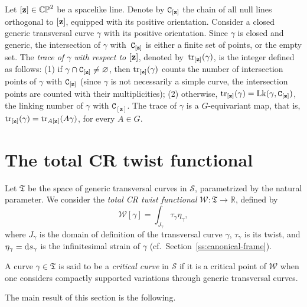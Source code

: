 \documentclass[pdftex]{sigma}
\numberwithin{equation}{section}
\begin{document}
 \begin{Definition}
Let $[{\bf z}]\in \mathbb{CP}^2$ be a spacelike line.
Denote by ${\mathtt C}_{[{\bf z}]}$ the chain of all null lines orthogonal to $[{\bf z}]$, equipped with its positive orientation.
Consider a closed generic transversal curve $\gamma$ with its positive orientation.
Since $\gamma$ is closed and generic, the intersection of $\gamma$ with~${\mathtt C}_{[{\bf z}]}$ is either a finite
set of points, or
the empty set.
The \emph{trace of $\gamma$ with respect to $[{\bf z}]$}, denoted by~${\rm tr}_{[{\mathbf z}]}(\gamma)$,
 is the integer defined as follows: (1) if $\gamma \cap {\mathtt C}_{[{\bf z}]}\neq \varnothing$,
 then ${\rm tr}_{[{\bf z}]}(\gamma)$ counts the number of intersection points of $\gamma$ with ${\mathtt C}_{[{\bf z}]}$
 (since $\gamma$ is not necessarily a simple curve, the intersection points are counted with their multiplicities); (2)
 otherwise, ${\rm tr}_{[{\bf z}]}(\gamma)={\rm Lk}(\gamma, {\mathtt C}_{[{\bf z}]})$, the linking number of
 $\gamma$ with ${\mathtt C}_{[\mathbf{z}]}$. The trace of $\gamma$ is a $G$-equivariant map,
 that is, ${\rm tr}_{[{\bf z}]}(\gamma) = {\rm tr}_{{A}[{\bf z}]}({A}\gamma)$, for every ${A}\in G$.
 \end{Definition}

\section{The total CR twist functional}\label{s:total-twist}

Let $\mathfrak{T}$ be the space of generic transversal curves in $\mathcal{S}$, parametrized by the natural parameter.
We consider the \textit{total CR twist functional} $\mathcal{W} \colon \mathfrak{T} \to \mathbb R$, defined by
\begin{equation*}%
 \mathcal{W}[\gamma] = \int_{J_\gamma} { \tau_\gamma  \eta_\gamma}  ,
 \end{equation*}
where ${J_\gamma}$ is the domain of definition of the transversal curve $\gamma$, $\tau_\gamma$
is its twist, and $\eta_\gamma= {\rm d}s_\gamma$ is the infinitesimal strain of $\gamma$ (cf.\ Section~\ref{ss:canonical-frame}).

A curve $\gamma \in \mathfrak{T}$ is said to be a \textit{critical curve}
in $\mathcal{S}$ if it is a critical point of
$\mathcal{W}$ when one considers compactly
supported variations through generic transversal curves.

The main result of this section is the following.
\end{document}
